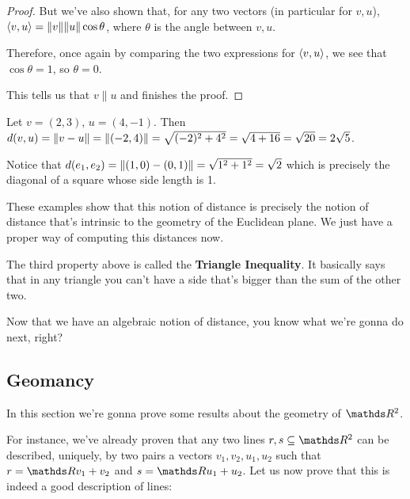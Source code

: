 \begin{proof}
	But we've also shown that, for any two vectors (in particular for $v,u$), $\langle v,u\rangle=\lVert v\rVert\lVert u\rVert\cos\theta$, where $\theta$ is the angle between $v,u$.
	
	Therefore, once again by comparing the two expressions for $\langle v,u\rangle$, we see that $\cos\theta=1$, so $\theta=0$.
	
	This tells us that $v\parallel u$ and finishes the proof.
\end{proof}

\begin{ex}
	Let $v=(2,3)$, $u=(4,-1)$. Then $d(v,u)=\lVert v-u\rVert=\lVert(-2,4)\rVert=\sqrt{(-2)^2+4^2}=\sqrt{4+16}=\sqrt{20}=2\sqrt 5$.
	
	Notice that $d(e_1,e_2)=\lVert(1,0)-(0,1)\rVert=\sqrt{1^2+1^2}=\sqrt{2}$ which is precisely the diagonal of a square whose side length is 1. 
	
	These examples show that this notion of distance is precisely the notion of distance that's intrinsic to the geometry of the Euclidean plane. We just have a proper way of computing this distances now.
\end{ex}

\begin{rmk}
	The third property above is called the \textbf{Triangle Inequality}. It basically says that in any triangle you can't have a side that's bigger than the sum of the other two.
\end{rmk}

Now that we have an algebraic notion of distance, you know what we're gonna do next, right?

\subsection{Geomancy}

In this section we're gonna prove some results about the geometry of $\R^2$.

For instance, we've already proven that any two lines $r,s\subseteq \R^2$ can be described, uniquely, by two pairs a vectors $v_1,v_2,u_1,u_2$ such that $r=\R v_1+v_2$ and $s=\R u_1+u_2$. Let us now prove that this is indeed a good description of lines:

